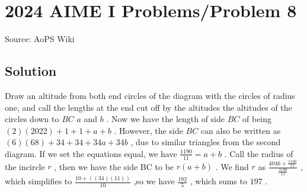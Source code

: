 \documentclass[12pt]{article}
\begin{document}
\section*{{2024 AIME I Problems/Problem 8}}
Source: AoPS Wiki

\subsection*{Solution}
Draw an altitude from both end circles of the diagram with the circles of radius one, and call the lengths at the end cut off by the altitudes the altitudes of the circles down to $BC$ $a$ and $b$ . Now we have the length of side $BC$ of being $(2)(2022)+1+1+a+b$ . However, the side $BC$ can also be written as $(6)(68)+34+34+34a+34b$ , due to similar triangles from the second diagram. If we set the equations equal, we have $\frac{1190}{11} = a+b$ . Call the radius of the incircle $r$ , then we have the side BC to be $r(a+b)$ . We find $r$ as $\frac{4046+\frac{1190}{11}}{\frac{1190}{11}}$ , which simplifies to $\frac{10+((34)(11))}{10}$ ,so we have $\frac{192}{5}$ , which sums to $\boxed{197}$ .
\end{document}
